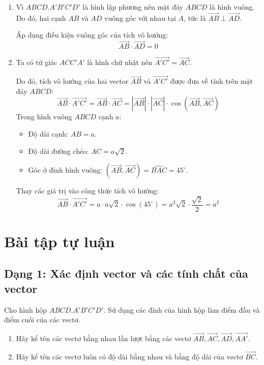 \documentclass[12pt]{article}
\begin{document}
	\begin{loigiai}
		\begin{enumerate}[label=\alph*)]
			\item Vì $ABCD.A'B'C'D'$ là hình lập phương nên mặt đáy $ABCD$ là hình vuông. Do đó, hai cạnh $AB$ và $AD$ vuông góc với nhau tại $A$, tức là $\overrightarrow{AB} \perp \overrightarrow{AD}$.
			
			Áp dụng điều kiện vuông góc của tích vô hướng:
			$$ \overrightarrow{AB} \cdot \overrightarrow{AD} = 0 $$
			
			\item Ta có tứ giác $ACC'A'$ là hình chữ nhật nên $\overrightarrow{A'C'} = \overrightarrow{AC}$.
			
			Do đó, tích vô hướng của hai vector $\overrightarrow{AB}$ và $\overrightarrow{A'C'}$ được đưa về tính trên mặt đáy $ABCD$:
			$$ \overrightarrow{AB} \cdot \overrightarrow{A'C'} = \overrightarrow{AB} \cdot \overrightarrow{AC} = |\overrightarrow{AB}| \cdot |\overrightarrow{AC}| \cdot \cos(\overrightarrow{AB}, \overrightarrow{AC}) $$
			Trong hình vuông $ABCD$ cạnh $a$:
			\begin{itemize}
				\item Độ dài cạnh: $AB = a$.
				\item Độ dài đường chéo: $AC = a\sqrt{2}$.
				\item Góc ở đỉnh hình vuông: $(\overrightarrow{AB}, \overrightarrow{AC}) = \widehat{BAC} = 45^\circ$.
			\end{itemize}
			Thay các giá trị vào công thức tích vô hướng:
			$$ \overrightarrow{AB} \cdot \overrightarrow{A'C'} = a \cdot a\sqrt{2} \cdot \cos(45^\circ) = a^2\sqrt{2} \cdot \frac{\sqrt{2}}{2} = a^2 $$
		\end{enumerate}
	\end{loigiai}
	
	\newpage
	
	\section{Bài tập tự luận}

	
	\subsection{Dạng 1: Xác định vector và các tính chất của vector}	
	
	\begin{btxanh}[]
		Cho hình hộp $ABCD.A'B'C'D'$. Sử dụng các đỉnh của hình hộp làm điểm đầu và điểm cuối của các vectơ.
		\begin{enumerate}[label=\alph*)]
			\item Hãy kể tên các vectơ bằng nhau lần lượt bằng các vectơ $\overrightarrow{AB}, \overrightarrow{AC}, \overrightarrow{AD}, \overrightarrow{AA'}$.
			\item Hãy kể tên các vectơ luôn có độ dài bằng nhau và bằng độ dài của vectơ $\overrightarrow{BC}$.
		\end{enumerate}
	\end{btxanh}
	
\end{document}
